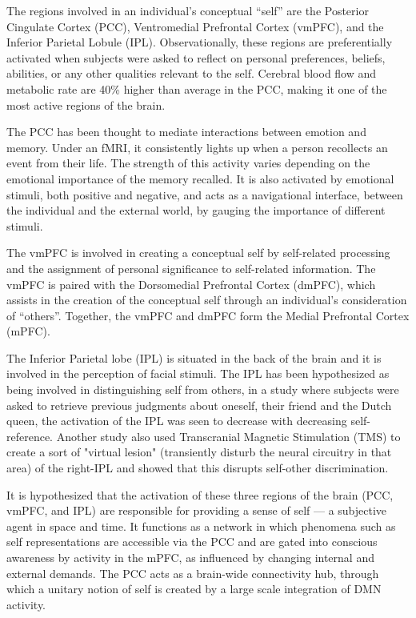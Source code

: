 \documentclass[a4paper, amsfonts, amssymb, amsmath, reprint, showkeys, nofootinbib, twoside]{revtex4-1}
\begin{document}
The regions involved in an individual's conceptual ``self'' are the Posterior
Cingulate Cortex (PCC), Ventromedial Prefrontal Cortex (vmPFC), and the Inferior
Parietal Lobule (IPL). Observationally, these regions are preferentially activated when
subjects were asked to reflect on personal preferences, beliefs, abilities, or
any other qualities relevant to the self. \cite{defaultnetworkadaptive} Cerebral
blood flow and metabolic rate are 40\% higher than average in the PCC,
making it one of the most active regions of the brain. \cite{pccrole}

The PCC has been thought to mediate interactions between emotion and memory.
Under an fMRI, it consistently lights up when a person recollects an event from their
life. The strength of this activity varies depending on the emotional importance of
the memory recalled. It is also activated by emotional stimuli,
both positive and negative, and acts as a navigational interface, between the individual
and the external world, by gauging the importance of different stimuli. \cite{pccemotion}

The vmPFC is involved in creating a conceptual self by self-related processing
and the assignment of personal significance to self-related
information. \cite{dmnself} The vmPFC is paired with the Dorsomedial Prefrontal
Cortex (dmPFC), which assists in the creation of the conceptual self through an
individual's consideration of ``others''. Together, the vmPFC and dmPFC form the
Medial Prefrontal Cortex (mPFC).

The Inferior Parietal lobe (IPL) is situated in the back of the brain and it is
involved in the perception of facial stimuli. \cite{ipl}
The IPL has been hypothesized as being involved in distinguishing self from others,
in a study where subjects were asked to retrieve
previous judgments about oneself, their friend and the Dutch queen,
the activation of the IPL was seen to decrease with decreasing self-reference. \cite{iplself}
Another study also used Transcranial Magnetic Stimulation (TMS) to create a sort of "virtual lesion"
(transiently disturb the neural circuitry in that area) of
the right-IPL and showed that this disrupts self-other discrimination. \cite{ipltms}

It is hypothesized that the activation of these three regions of the brain (PCC,
vmPFC, and IPL) are responsible for providing a sense of self --- a subjective agent
in space and time. It functions as a network in which phenomena such as self
representations are accessible via the PCC \cite{mappingself} and are gated into
conscious awareness by activity in the mPFC, as influenced by changing internal
and external demands. The PCC acts as a brain-wide connectivity hub, through which a unitary notion of self is
created by a large scale integration of DMN activity. \cite{mappingself}
\end{document}
